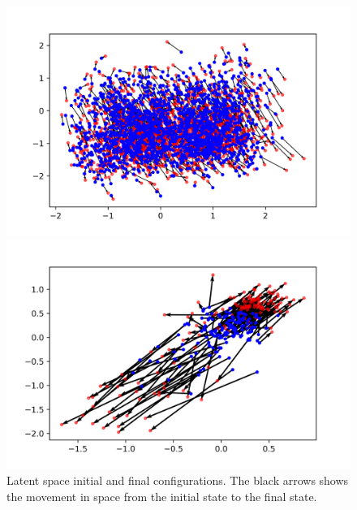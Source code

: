 \documentclass[mscthesis]{usiinfthesis}
\begin{document}
\begin{figure}[ht] 
  \begin{minipage}[b]{0.5\linewidth}
    \centering
    \includegraphics[width=\linewidth]{latentspace_species.png} 
    \vspace{4ex}
  \end{minipage}%
  \begin{minipage}[b]{0.5\linewidth}
    \centering
    \includegraphics[width=\linewidth]{latentspace_region.png} 
    \vspace{4ex}
  \end{minipage}  
\caption{Latent space initial and final configurations. The black arrows shows the movement in space from the initial state to the final state.}
\label{fig:latentspace_config}
\end{figure}
\end{document}
